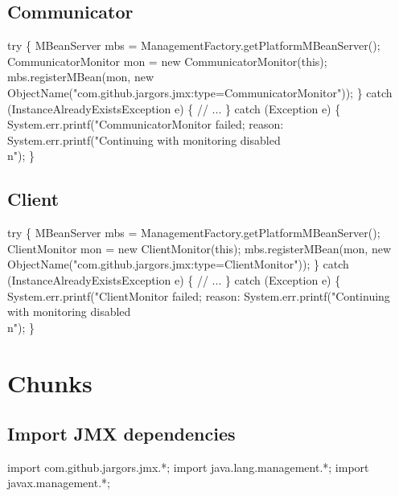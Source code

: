 \subsection{Communicator}
\nwenddocs{}\endmoddef{}
try \{
  MBeanServer mbs = ManagementFactory.getPlatformMBeanServer();
  CommunicatorMonitor mon = new CommunicatorMonitor(this);
  mbs.registerMBean(mon, new ObjectName("com.github.jargors.jmx:type=CommunicatorMonitor"));
\} catch (InstanceAlreadyExistsException e) \{
  // ...
\} catch (Exception e) \{
  System.err.printf("CommunicatorMonitor failed; reason: %
  System.err.printf("Continuing with monitoring disabled\\n");
\}
\nwendcode{}\nwdocspar

\subsection{Client}
\nwenddocs{}\endmoddef{}
try \{
  MBeanServer mbs = ManagementFactory.getPlatformMBeanServer();
  ClientMonitor mon = new ClientMonitor(this);
  mbs.registerMBean(mon, new ObjectName("com.github.jargors.jmx:type=ClientMonitor"));
\} catch (InstanceAlreadyExistsException e) \{
  // ...
\} catch (Exception e) \{
  System.err.printf("ClientMonitor failed; reason: %
  System.err.printf("Continuing with monitoring disabled\\n");
\}
\nwendcode{}\nwdocspar

\section{Chunks}
\subsection{Import JMX dependencies}
\nwenddocs{}\endmoddef{}
import com.github.jargors.jmx.*;
import java.lang.management.*;
import javax.management.*;
\nwendcode{}\nwdocspar

